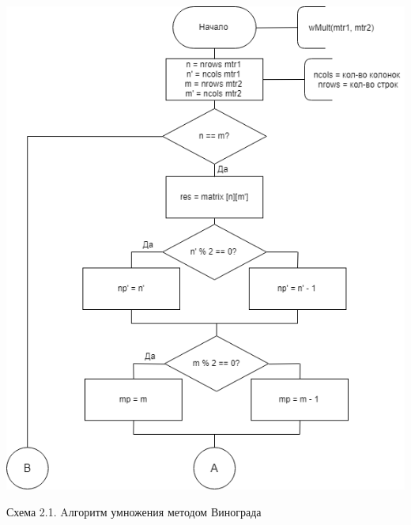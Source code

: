 \documentclass[12pt]{report}
\begin{document}
\begin{center}
    \includegraphics[scale=0.7]{WinogradMult}

	 Схема 2.1. Aлгоритм умножения методом Винограда


\end{center}
\end{document}
